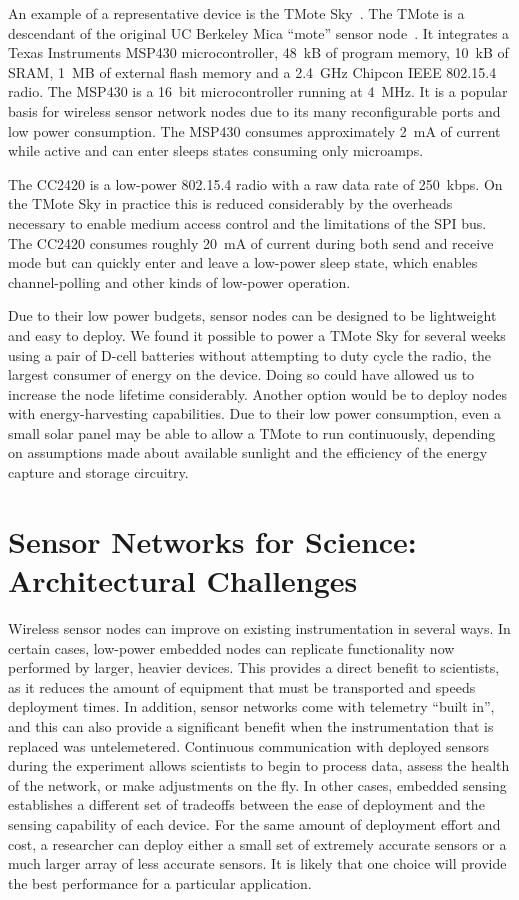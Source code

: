 An example of a representative device is the TMote Sky~\cite{moteiv}. The
TMote is a descendant of the original UC Berkeley Mica ``mote'' sensor
node~\cite{hill-thesis}. It integrates a Texas Instruments MSP430
microcontroller, 48~kB of program memory, 10~kB of SRAM, 1~MB of external
flash memory and a 2.4~GHz Chipcon IEEE 802.15.4 radio. The MSP430 is a
16~bit microcontroller running at 4~MHz.  It is a popular basis for wireless
sensor network nodes due to its many reconfigurable ports and low power
consumption. The MSP430 consumes approximately 2~mA of current while active
and can enter sleeps states consuming only microamps.

The CC2420 is a low-power 802.15.4 radio with a raw data rate of 250~kbps. On
the TMote Sky in practice this is reduced considerably by the overheads
necessary to enable medium access control and the limitations of the SPI bus.
The CC2420 consumes roughly 20~mA of current during both send and receive
mode but can quickly enter and leave a low-power sleep state, which enables
channel-polling and other kinds of low-power operation.

Due to their low power budgets, sensor nodes can be designed to be
lightweight and easy to deploy. We found it possible to power a TMote Sky for
several weeks using a pair of D-cell batteries without attempting to duty
cycle the radio, the largest consumer of energy on the device. Doing so could
have allowed us to increase the node lifetime considerably. Another option
would be to deploy nodes with energy-harvesting capabilities. Due to their
low power consumption, even a small solar panel may be able to allow a TMote
to run continuously, depending on assumptions made about available sunlight
and the efficiency of the energy capture and storage circuitry.

\section{Sensor Networks for Science: Architectural Challenges}

Wireless sensor nodes can improve on existing instrumentation in several
ways. In certain cases, low-power embedded nodes can replicate functionality
now performed by larger, heavier devices. This provides a direct benefit to
scientists, as it reduces the amount of equipment that must be transported
and speeds deployment times. In addition, sensor networks come with telemetry
``built in'', and this can also provide a significant benefit when the
instrumentation that is replaced was untelemetered. Continuous communication
with deployed sensors during the experiment allows scientists to begin to
process data, assess the health of the network, or make adjustments on the
fly. In other cases, embedded sensing establishes a different set of
tradeoffs between the ease of deployment and the sensing capability of each
device. For the same amount of deployment effort and cost, a researcher can
deploy either a small set of extremely accurate sensors or a much larger
array of less accurate sensors. It is likely that one choice will provide the
best performance for a particular application.

